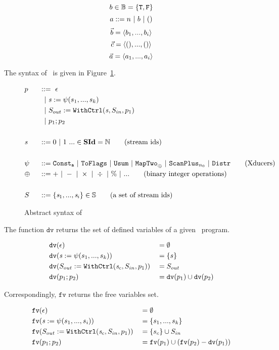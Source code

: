 $$b \in \mathbb{B} = \{\mathtt{T},\mathtt{F} \}$$
$$ a ::= n \ | \ b \ | \ ()$$
$$\vec b = \langle b_1,...,b_i \rangle$$ 
$$\vec c = \langle (),...,() \rangle $$
$$\vec a = \langle a_1,...,a_i \rangle  $$ 

\hspace{1cm}

The syntax of \fmsvcode \  is given in Figure~\ref{fig-svcode-grammar}.


\begin{figure}[H] \large
	\begin{alignat*}{2}
	&p  && :: = \ \epsilon \\ 
	&   &&\ \ | \ \mathit{s} := \psi(s_1,...,s_k) \\
	&   &&\ \ | \ S_{out} := \mathtt{WithCtrl}(\mathit{s},S_{in},p_1) \\
	&   &&\ \ | \ p_1;p_2  \\
	\\
	&\mathit{s} && ::= 0 \ | \ 1 \ ... \in \mathbf{SId}  = \mathbb{N}   \tag{stream ids}\\
	\\
	& \psi \ && ::= \mathtt{Const_{a}} \ | \ \mathtt{ToFlags}  
	\ | \ \mathtt{Usum} \ | \ \mathtt{MapTwo}_{\oplus} \ | \ \mathtt{ScanPlus}_{n_0} \ | \ \mathtt{Distr}  \tag{Xducers} \\
	& \oplus \ && :: = + \ | \ - \ | \ \times \ | \ \div \ | \ \% \ | \ ...  \tag{binary integer operations}\\
	\\
	&  S && ::= \{\mathit{s}_1,..., \mathit{s}_i\} \in \mathbb{S}  \tag{a set of stream ids}
	\end{alignat*}
	\caption{Abstract syntax of \fmsvcode \  \label{fig-svcode-grammar}}
\end{figure}


The function $\texttt{dv}$ returns the set of defined variables of a given \fmsvcode \  program.

\begin{alignat*}{2}
&\mathtt{dv}(\epsilon) && =  \emptyset \\
&\mathtt{dv}(\mathit{s} := \psi(s_1,...,s_k)) && =  \{s\} \\
&\mathtt{dv}(S_{out} := \mathtt{WithCtrl}(\mathit{s}_c,S_{in},p_1)) && =   S_{out} \\
&\mathtt{dv}(p_1;p_2) && =  \mathtt{dv}(p_1) \cup \mathtt{dv}(p_2) \\
\end{alignat*}

Correspondingly, $\texttt{fv}$ returns the free variables set.

\begin{alignat*}{2}
&\mathtt{fv}(\epsilon) && = \emptyset \\
&\mathtt{fv}(\mathit{s} := \psi(s_1,...,s_i)) && = \{s_1,...,s_k\}\\
&\mathtt{fv}(S_{out} := \mathtt{WithCtrl}(\mathit{s}_c,S_{in},p_1)) && = \{s_c\} \cup S_{in} \\
&\mathtt{fv}(p_1;p_2) && = \mathtt{fv}(p_1) \cup (\mathtt{fv}(p_2) - \mathtt{dv}(p_1)) \\
\end{alignat*}


